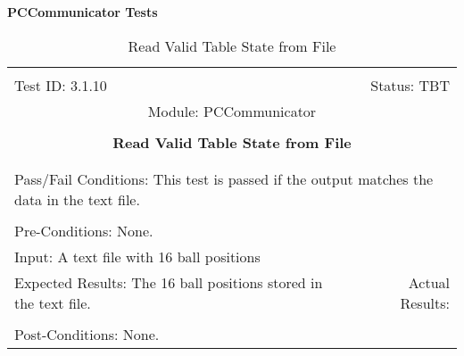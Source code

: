 \documentclass[titlepage]{article}
\begin{document}
\large{\textbf{PCCommunicator Tests}}
\begin{center}%
\begin{table}
\begin{tabular}{|l r|}\hline&\\[-2mm]
	Test ID: 3.1.10	&Status: TBT\\[-3mm]
	\multicolumn{2}{|c|}{Module: PCCommunicator}\\&\\
	\multicolumn{2}{|c|}{\textbf{\large{Read Valid Table State from File}}}\\&\\\hline&\\[-3mm]
	\multicolumn{2}{|p{\textwidth}|}{Pass/Fail Conditions: This test is passed if the output matches the data in the text file.}\\[1mm]\hline&\\[-3mm]
	\multicolumn{2}{|p{\textwidth}|}{Pre-Conditions: None.}\\[4mm]
	\multicolumn{2}{|p{\textwidth}|}{Input: A text file with 16 ball positions}\\[2mm]\hline
	\multicolumn{1}{|p{0.49\textwidth}}{Expected Results: The 16 ball positions stored in the text file.}	&\multicolumn{1}{|p{0.45\textwidth}|}{Actual Results: }\\\hline&\\[-3mm]
	\multicolumn{2}{|p{\textwidth}|}{Post-Conditions: None.}\\\hline
\end{tabular}
\caption{Read Valid Table State from File}
\end{table}
\end{center}
\end{document}
